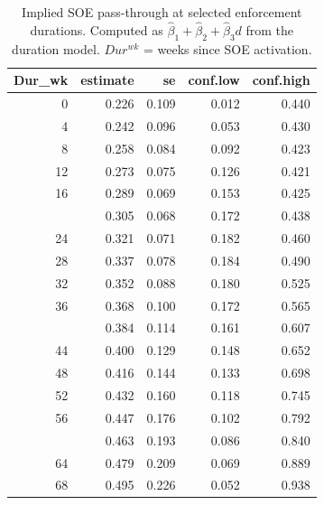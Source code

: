 \begin{table}[!h]
\centering
\caption{\label{tab:tab:passthrough_implied_soe}Implied SOE pass-through at selected enforcement durations. Computed as $\hat{\beta}_1 + \hat{\beta}_2 + \hat{\beta}_3 d$ from the duration model. $Dur^{wk}$ = weeks since SOE activation.}
\centering
\begin{tabular}[t]{rrrrr}
\toprule
Dur\_wk & estimate & se & conf.low & conf.high\\
\midrule
0 & 0.226 & 0.109 & 0.012 & 0.440\\
4 & 0.242 & 0.096 & 0.053 & 0.430\\
8 & 0.258 & 0.084 & 0.092 & 0.423\\
12 & 0.273 & 0.075 & 0.126 & 0.421\\
16 & 0.289 & 0.069 & 0.153 & 0.425\\
\addlinespace
20 & 0.305 & 0.068 & 0.172 & 0.438\\
24 & 0.321 & 0.071 & 0.182 & 0.460\\
28 & 0.337 & 0.078 & 0.184 & 0.490\\
32 & 0.352 & 0.088 & 0.180 & 0.525\\
36 & 0.368 & 0.100 & 0.172 & 0.565\\
\addlinespace
40 & 0.384 & 0.114 & 0.161 & 0.607\\
44 & 0.400 & 0.129 & 0.148 & 0.652\\
48 & 0.416 & 0.144 & 0.133 & 0.698\\
52 & 0.432 & 0.160 & 0.118 & 0.745\\
56 & 0.447 & 0.176 & 0.102 & 0.792\\
\addlinespace
60 & 0.463 & 0.193 & 0.086 & 0.840\\
64 & 0.479 & 0.209 & 0.069 & 0.889\\
68 & 0.495 & 0.226 & 0.052 & 0.938\\
\bottomrule
\end{tabular}
\end{table}
